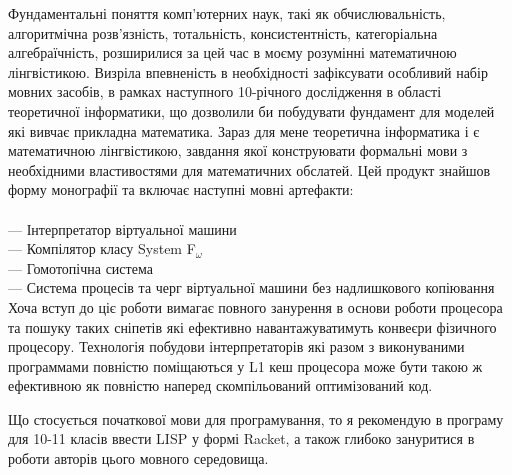 Фундаментальні поняття комп'ютерних наук, такі як обчислювальність,
алгоритмічна розв'язність, тотальність, консистентність,
категоріальна алгебраїчність, розширилися за цей час в моєму
розумінні математичною лінгвістикою. Визріла впевненість в
необхідності зафіксувати особливий набір мовних засобів, в
рамках наступного 10-річного дослідження в області теоретичної
інформатики, що дозволили би побудувати фундамент для моделей
які вивчає прикладна математика. Зараз для мене теоретична
інформатика і є математичною лінгвістикою, завдання якої
конструювати формальні мови з необхідними властивостями для
математичних обслатей. Цей продукт знайшов форму монографії
та включає наступні мовні артефакти:
\\
\\
\noindent--- Інтерпретатор віртуальної машини\\
--- Компілятор класу System F$_\omega$\\
--- Гомотопічна система\\
--- Система процесів та черг віртуальної машини без надлишкового копіювання\\

Хоча вступ до ціє роботи вимагає повного занурення в основи
роботи процесора та пошуку таких сніпетів які ефективно
навантажуватимуть конвеєри фізичного процесору. Технологія
побудови інтерпретаторів які разом з виконуваними программами
повністю поміщаються у L1 кеш процесора може бути такою ж
ефективною як повністю наперед скомпільований оптимізований код.

Що стосується початкової мови для програмування, то я рекомендую
в програму для 10-11 класів ввести LISP у формі Racket, а також
глибоко зануритися в роботи авторів цього мовного середовища.

